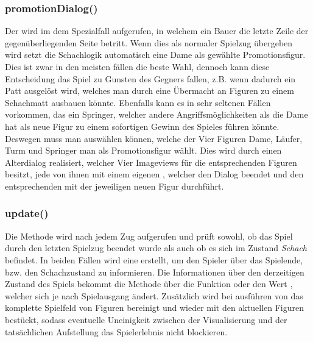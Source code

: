 \subsubsection{promotionDialog()}
Der  wird im dem Spezialfall aufgerufen, in welchem ein 
Bauer die letzte Zeile der gegenüberliegenden Seite betritt. Wenn dies als 
normaler Spielzug übergeben wird setzt die Schachlogik automatisch eine Dame als 
gewählte Promotionsfigur. Dies ist zwar in den meisten fällen die beste Wahl, 
dennoch kann diese Entscheidung das Spiel zu Gunsten des Gegners fallen, z.B. 
wenn dadurch ein Patt ausgelöst wird, welches man durch eine Übermacht an 
Figuren zu einem Schachmatt ausbauen könnte. Ebenfalls kann es in sehr seltenen 
Fällen vorkommen, das ein Springer, welcher andere Angriffsmöglichkeiten als die 
Dame hat als neue Figur zu einem sofortigen Gewinn des Spieles führen könnte. 
Deswegen muss man auswählen können, welche der Vier Figuren Dame, Läufer, Turm 
und Springer man als Promotionsfigur wählt. Dies wird durch einen Alterdialog 
realisiert, welcher Vier Imageviews für die entsprechenden Figuren besitzt, jede 
von ihnen mit einem eigenen , welcher den Dialog 
beendet und den entsprechenden   mit der jeweiligen neuen 
Figur durchführt.

\subsubsection{update()}
Die Methode  wird nach jedem Zug aufgerufen und prüft sowohl, ob 
das Spiel durch den letzten Spielzug beendet wurde als auch ob es sich im 
Zustand \emph{Schach} befindet. In beiden Fällen wird eine  
erstellt, um den Spieler über das Spielende, bzw. den Schachzustand zu 
informieren. Die Informationen über den derzeitigen Zustand des Spiels bekommt 
die Methode über die Funktion  oder den Wert , 
welcher sich je nach Spielausgang ändert. Zusätzlich wird bei ausführen von 
 das komplette Spielfeld von Figuren bereinigt und 
wieder mit den aktuellen Figuren bestückt, sodass eventuelle Uneinigkeit 
zwischen der Visualisierung und der tatsächlichen Aufstellung das Spielerlebnis 
nicht blockieren.

